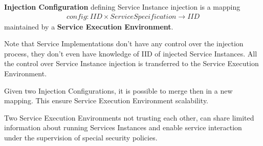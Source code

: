 \textbf{Injection Configuration} defining Service Instance injection is a mapping
\begin{eqnarray}\label{sseconfig}
config: IID \times Service Specification \longrightarrow IID \nonumber
\end{eqnarray}
maintained by a \textbf{Service Execution Environment}.

Note that Service Implementations don't have any control over the injection process, they don't even have knowledge of IID of injected Service Instances. All the control over Service Instance injection is transferred to the Service Execution Environment.

Given two Injection Configurations, it is possible to merge then in a new mapping. This ensure Service Execution Environment scalability.

Two Service Execution Environments not trusting each other, can share limited information about running Services Instances and enable service interaction under the supervision of special security policies.





